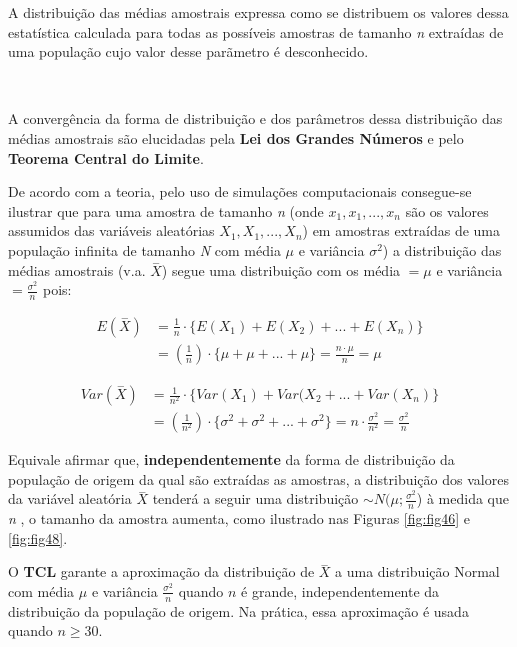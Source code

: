 \documentclass[
]{book}
\begin{document}
A distribuição das médias amostrais expressa como se distribuem os valores dessa estatística calculada para todas as possíveis amostras de tamanho \emph{n} extraídas de uma população cujo valor desse parãmetro é desconhecido.

~

A convergência da forma de distribuição e dos parâmetros dessa distribuição das médias amostrais são elucidadas pela \textbf{Lei dos Grandes Números} e pelo \textbf{Teorema Central do Limite}.

\hfill\break

De acordo com a teoria, pelo uso de simulações computacionais consegue-se ilustrar que para uma amostra de tamanho \emph{n} (onde \(x_{1},x_{1},...,x_{n}\) são os valores assumidos das variáveis aleatórias \(X_{1},X_{1},...,X_{n}\)) em amostras extraídas de uma população infinita de tamanho \emph{N} com média \(\mu\) e variância \(\sigma^{2}\)) a distribuição das médias amostrais (v.a. \(\stackrel{-}{X}\)) segue uma distribuição com os média \(=\mu\) e variância \(=\frac{\sigma^{2}}{n}\) pois:

\hfill\break

\begin{align*}
E(\stackrel{-}{X})  & = \frac{1}{n} \cdot \{E(X_{1})+E(X_{2})+...+E(X_{n})\} \\
                    & = (\frac{1}{n})\cdot\{\mu+\mu+...+\mu\} = \frac{n\cdot\mu}{n} = \mu 
\end{align*}

\hfill\break

\begin{align*}
Var(\stackrel{-}{X}) & =  \frac{1}{n^{2}} \cdot \{Var(X_{1})+Var(X_{2}+...+Var(X_{n})\} \\
                     & = (\frac{1}{n^{2}}) \cdot \{\sigma^{2}+\sigma^{2}+...+\sigma^{2}\} = n \cdot \frac{\sigma^{2}}{n^{2}} = \frac{\sigma^{2}}{n}
\end{align*}

\hfill\break

Equivale afirmar que, \textbf{independentemente} da forma de distribuição da população de origem da qual são extraídas as amostras, a distribuição dos valores da variável aleatória \(\stackrel{-}{X}\) tenderá a seguir uma distribuição \(\sim N(\mu;\frac{\sigma^{2}}{n}\)) à medida que \emph{n} , o tamanho da amostra aumenta, como ilustrado nas Figuras \ref{fig:fig46} e \ref{fig:fig48}.

\hfill\break

O \textbf{TCL} garante a aproximação da distribuição de \(\stackrel{-}{X}\) a uma distribuição Normal com média \(\mu\) e variância \(\frac{\sigma^{2}}{n}\) quando \(n\) é grande, independentemente da distribuição da população de origem. Na prática, essa aproximação é usada quando \(n\ge 30\).
\end{document}
